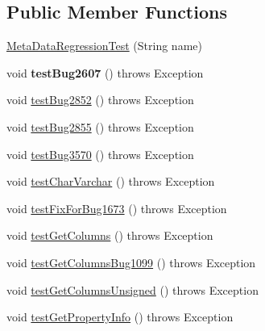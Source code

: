 \subsection*{Public Member Functions}
\begin{DoxyCompactItemize}
\item 
\mbox{\hyperlink{classtestsuite_1_1regression_1_1_meta_data_regression_test_aaba5b0477f0c35256919f9c00a28c461}{Meta\+Data\+Regression\+Test}} (String name)
\item 
\mbox{\label{classtestsuite_1_1regression_1_1_meta_data_regression_test_a2b9dcc0e397f42daa33e068203ec5277}} 
void {\bfseries test\+Bug2607} ()  throws Exception 
\item 
void \mbox{\hyperlink{classtestsuite_1_1regression_1_1_meta_data_regression_test_a37ae44d17afdb072e212dace2d333db9}{test\+Bug2852}} ()  throws Exception 
\item 
void \mbox{\hyperlink{classtestsuite_1_1regression_1_1_meta_data_regression_test_a7575c81c706f7b3eb33eafce244b371a}{test\+Bug2855}} ()  throws Exception 
\item 
void \mbox{\hyperlink{classtestsuite_1_1regression_1_1_meta_data_regression_test_a6b6d260139fb71288f93be76dac3f047}{test\+Bug3570}} ()  throws Exception 
\item 
void \mbox{\hyperlink{classtestsuite_1_1regression_1_1_meta_data_regression_test_a34109c03092379ea3c085035c26f8343}{test\+Char\+Varchar}} ()  throws Exception 
\item 
void \mbox{\hyperlink{classtestsuite_1_1regression_1_1_meta_data_regression_test_ab44999b95186ac7d583472c97d1fe24c}{test\+Fix\+For\+Bug1673}} ()  throws Exception 
\item 
void \mbox{\hyperlink{classtestsuite_1_1regression_1_1_meta_data_regression_test_a858c6ccbb86008517405f2e20ff56399}{test\+Get\+Columns}} ()  throws Exception 
\item 
void \mbox{\hyperlink{classtestsuite_1_1regression_1_1_meta_data_regression_test_af4ecb86f35850a0a32d35dd22a705df0}{test\+Get\+Columns\+Bug1099}} ()  throws Exception 
\item 
void \mbox{\hyperlink{classtestsuite_1_1regression_1_1_meta_data_regression_test_a04c1681aefa888950a3247f4495100c9}{test\+Get\+Columns\+Unsigned}} ()  throws Exception 
\item 
void \mbox{\hyperlink{classtestsuite_1_1regression_1_1_meta_data_regression_test_a19b374def5386df4eb8d89ef0c85375f}{test\+Get\+Property\+Info}} ()  throws Exception 

\end{DoxyCompactItemize}
